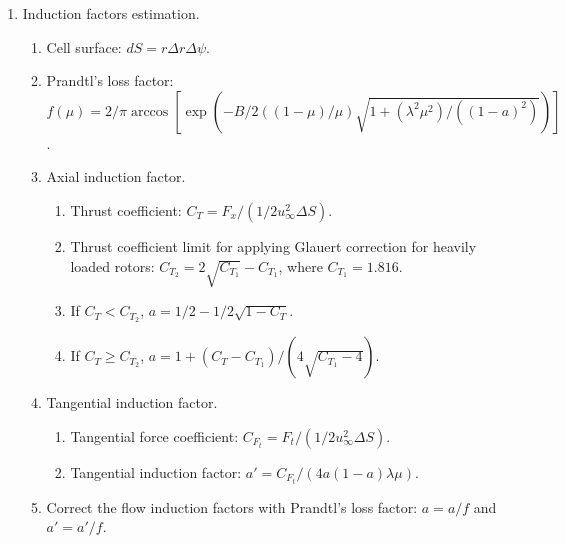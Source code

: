 \begin{enumerate}
\begin{enumerate}
	\end{enumerate}

	\item Induction factors estimation.
	
	\begin{enumerate}
		
		\item Cell surface: $ dS = r \Delta r \Delta \psi $.
		
		\item Prandtl's loss factor: $ f(\mu) = 2/\pi \arccos \left[ \exp \left( - B/2 \left( (1-\mu)/\mu \right) \sqrt{1+(\lambda^2\mu^2)/((1-a)^2)} \right) \right] $.
		
		\item Axial induction factor.
		
		\begin{enumerate}
			
			\item Thrust coefficient: $ C_T = F_x/(1/2 u_{\infty}^2 \Delta S) $.
			
			\item Thrust coefficient limit for applying Glauert correction for heavily loaded rotors: $ C_{T_2} = 2 \sqrt{C_{T_1}} - C_{T_1} $, where $ C_{T_1} = 1.816 $.
			
			\item If $ C_T < C_{T_2} $, $ a = 1/2 - 1/2 \sqrt{1-C_T} $.
			
			\item If $ C_T \geq C_{T_2} $, $ a = 1 + (C_T-C_{T_1})/(4 \sqrt{C_{T_1}-4}) $.
			
		\end{enumerate}
	
		\item Tangential induction factor.
		
		\begin{enumerate}
			
			\item Tangential force coefficient: $ C_{F_t} = F_t/(1/2 u_{\infty}^2 \Delta S) $.
			
			\item Tangential induction factor: $ a' = C_{F_t} / (4a (1-a) \lambda \mu) $.
			
		\end{enumerate}
	
		\item Correct the flow induction factors with Prandtl's loss factor: $ a = a/f $ and $ a' = a'/f $.
		
	\end{enumerate}
	

\end{enumerate}
